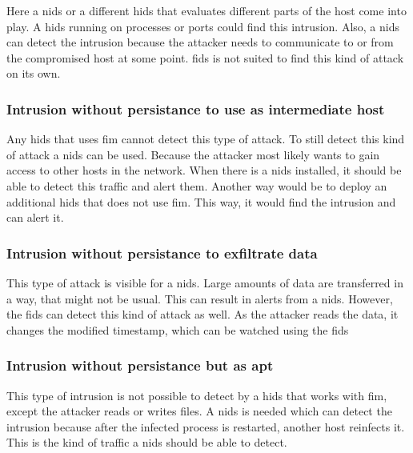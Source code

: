 Here a \gls{nids} or a different \gls{hids} that evaluates different parts of the host come into play. A \gls{hids} running on processes or ports could find this \gls{intrusion}. Also, a \gls{nids} can detect the \gls{intrusion} because the attacker needs to communicate to or from the compromised host at some point. \gls{fids} is not suited to find this kind of attack on its own.

\subsubsection{Intrusion without persistance to use as intermediate host}
\label{sec:defense:nopersistanceintermediatehost}

Any \gls{hids} that uses \gls{fim} cannot detect this type of attack. To still detect this kind of attack a \gls{nids} can be used. Because the attacker most likely wants to gain access to other hosts in the network. When there is a \gls{nids} installed, it should be able to detect this traffic and alert them. Another way would be to deploy an additional \gls{hids} that does not use \gls{fim}. This way, it would find the \gls{intrusion} and can alert it.

\subsubsection{Intrusion without persistance to exfiltrate data}
\label{sec:defense:nopersistanceexfiltration}

This type of attack is visible for a \gls{nids}. Large amounts of data are transferred in a way, that might not be usual. This can result in alerts from a \gls{nids}. However, the \gls{fids} can detect this kind of attack as well. As the attacker reads the data, it changes the modified timestamp, which can be watched using the \gls{fids}

\subsubsection{Intrusion without persistance but as apt}
\label{sec:defense:nopersistanceapt}

This type of \gls{intrusion} is not possible to detect by a \gls{hids} that works with \gls{fim}, except the attacker reads or writes files. A \gls{nids} is needed which can detect the \gls{intrusion} because after the infected process is restarted, another host reinfects it. This is the kind of traffic a \gls{nids} should be able to detect.

